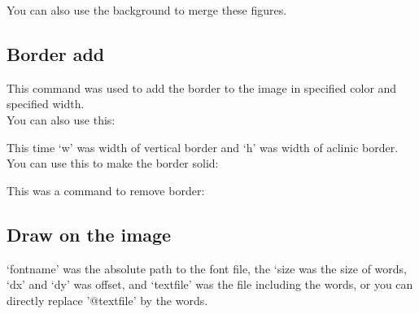 \documentclass[12pt]{article}
\begin{document}
You can also use the background to merge these figures.

\subsection{Border add}
{\centering{}\par}\vspace{5mm}

This command was used to add the border to the image in specified color and specified width.\\

You can also use this:\vspace{5mm}

{\centering{}\par}\vspace{5mm}

This time `w' was width of vertical border and `h' was width of aclinic border.\\

You can use this to make the border solid:\vspace{5mm}

{\centering{}\par}\vspace{5mm}

This was a command to remove border:\\

{\centering{}\par}

\subsection{Draw on the image}
{\centering{}\par}\vspace{5mm}

`fontname' was the absolute path to the font file, the `size was the size of words, `dx' and `dy' was offset, and `textfile' was the file including the words, or you can directly replace '@textfile' by the words.\vspace{5mm}
\end{document}

